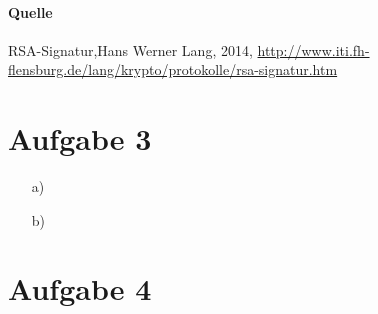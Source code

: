 \documentclass{scrartcl}
\begin{document}
\paragraph*{Quelle}
RSA-Signatur,Hans Werner Lang, 2014, \url{http://www.iti.fh-flensburg.de/lang/krypto/protokolle/rsa-signatur.htm}

\section*{Aufgabe 3}

\begin{itemize}
\item[a)] 
\item[b)]
\end{itemize}

\section*{Aufgabe 4}
\end{document}
